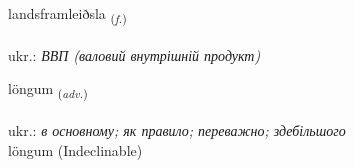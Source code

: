 \documentclass[frontgrid, backgrid]{flacards}\usepackage[]{graphicx}\usepackage[]{xcolor}
\begin{document}
\renewcommand{\flhead}{\vskip5pt \fboxsep=0pt {\small\bfseries\footnotesize Nafnorð | іменник}}
\renewcommand{\fcfoot}{\vskip5pt \fboxsep=0pt \hspace{2pt}{\small\bfseries\footnotesize 3K}}

\renewcommand{\blhead}{\vskip5pt {\small\bfseries\footnotesize Nafnorð | іменник }}
\renewcommand{\bcfoot}{\vskip5pt \hspace{2pt}{\small\bfseries\footnotesize 3K}}


{landsframleiðsla \small{\textsubscript{(\textit{f.})}} \\[1ex] %
\textphonetic{[lantsframleiðstla]} \\
ukr.: \emph{ВВП (валовий внутрішній продукт)} \\  [2ex]
\renewcommand*{\arraystretch}{0.8}
}


\renewcommand{\flhead}{\vskip5pt \fboxsep=0pt {\small\bfseries\footnotesize Atviksorð | прислівник}}
\renewcommand{\fcfoot}{\vskip5pt \fboxsep=0pt \hspace{2pt}{\small\bfseries\footnotesize 3K}}

\renewcommand{\blhead}{\vskip5pt {\small\bfseries\footnotesize Atviksorð | прислівник }}
\renewcommand{\bcfoot}{\vskip5pt \hspace{2pt}{\small\bfseries\footnotesize 3K}}


{löngum \small{\textsubscript{(\textit{adv.})}} \\[1ex]
\textphonetic{[lœiŋkʏm]} \\
ukr.: \emph{в основному; як правило; переважно; здебільшого} \\  [2ex]
löngum (Indeclinable)}
\end{document}

